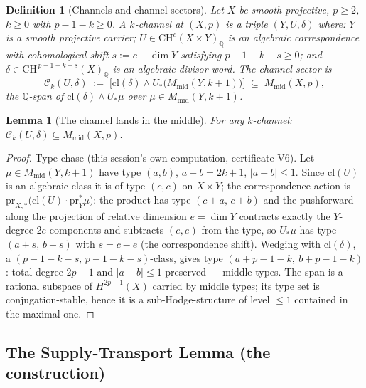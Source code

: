 \documentclass[11pt]{article}
\newtheorem{lemma}[theorem]{Lemma}
\newtheorem{definition}[theorem]{Definition}
\newcommand{\Q}{\mathbb{Q}}
\newcommand{\CH}{\mathrm{CH}}
\begin{document}
\begin{definition}[Channels and channel sectors]\label{def:channel}
Let $X$ be smooth projective, $p\ge2$, $k\ge0$ with $p-1-k\ge0$. A
\emph{$k$-channel} at $(X,p)$ is a triple $(Y,U,\delta)$ where:
$Y$ is a smooth projective \emph{carrier}; $U\in\CH^{c}(X\times Y)_\Q$ is
an algebraic correspondence with cohomological shift
$s:=c-\dim Y$ satisfying $p-1-k-s\ge0$; and
$\delta\in\CH^{\,p-1-k-s}(X)_\Q$ is an algebraic divisor-word. The
\emph{channel sector} is
\[
\mathcal{C}_k(U,\delta)\;:=\;\bigl[\mathrm{cl}(\delta)\wedge
U_*\bigl(M_{\mathrm{mid}}(Y,k+1)\bigr)\bigr]\;\subseteq\;
M_{\mathrm{mid}}(X,p),
\]
the $\Q$-span of $\mathrm{cl}(\delta)\wedge U_*\mu$ over
$\mu\in M_{\mathrm{mid}}(Y,k+1)$.
\end{definition}

\begin{lemma}[The channel lands in the middle]\label{lem:typing}
For any $k$-channel: $\mathcal{C}_k(U,\delta)\subseteq M_{\mathrm{mid}}(X,p)$.
\end{lemma}

\begin{proof}
Type-chase (this session's own computation, certificate V6). Let $\mu\in
M_{\mathrm{mid}}(Y,k+1)$ have type $(a,b)$, $a+b=2k+1$, $|a-b|\le1$.
Since $\mathrm{cl}(U)$ is an algebraic class it is of type $(c,c)$ on
$X\times Y$; the correspondence action is
$\mathrm{pr}_{X,*}\bigl(\mathrm{cl}(U)\cdot \mathrm{pr}_Y^*\mu\bigr)$:
the product has type $(c+a,\,c+b)$ and the pushforward along the
projection of relative dimension $e=\dim Y$
contracts exactly the $Y$-degree-$2e$ components and subtracts $(e,e)$
from the type, so $U_*\mu$ has type $(a+s,\,b+s)$ with $s=c-e$
(the correspondence shift). Wedging with $\mathrm{cl}(\delta)$, a
$(p-1-k-s,\,p-1-k-s)$-class, gives type
$(a+p-1-k,\ b+p-1-k)$: total degree $2p-1$ and $|a-b|\le1$ preserved ---
middle types. The span is a rational subspace of $H^{2p-1}(X)$ carried by
middle types; its type set is conjugation-stable, hence it is a
sub-Hodge-structure of level $\le1$ contained in the maximal one.
\end{proof}

\subsection{The Supply-Transport Lemma (the construction)}
\end{document}
